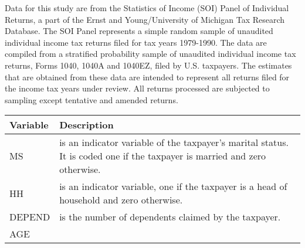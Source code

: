 \documentclass[]{book}
\begin{document}
Data for this study are from the Statistics of Income (SOI) Panel of Individual Returns, a part of the Ernst and Young/University of Michigan Tax Research Database. The SOI Panel represents a simple random sample of unaudited individual income tax returns filed for tax years 1979-1990. The data are compiled from a stratified probability sample of unaudited individual income tax returns, Forms 1040, 1040A and 1040EZ, filed by U.S. taxpayers. The estimates that are obtained from these data are intended to represent all returns filed for the income tax years under review. All returns processed are subjected to sampling except tentative and amended returns.

\begin{longtable}[]{@{}ll@{}}
\toprule
\begin{minipage}[b]{0.54\columnwidth}\raggedright
Variable\strut
\end{minipage} & \begin{minipage}[b]{0.40\columnwidth}\raggedright
Description\strut
\end{minipage}\tabularnewline
\midrule
\endhead
\begin{minipage}[t]{0.54\columnwidth}\raggedright
MS\strut
\end{minipage} & \begin{minipage}[t]{0.40\columnwidth}\raggedright
is an indicator variable of the taxpayer's marital status. It is coded one if the taxpayer is married and zero otherwise.\strut
\end{minipage}\tabularnewline
\begin{minipage}[t]{0.54\columnwidth}\raggedright
HH\strut
\end{minipage} & \begin{minipage}[t]{0.40\columnwidth}\raggedright
is an indicator variable, one if the taxpayer is a head of household and zero otherwise.\strut
\end{minipage}\tabularnewline
\begin{minipage}[t]{0.54\columnwidth}\raggedright
DEPEND\strut
\end{minipage} & \begin{minipage}[t]{0.40\columnwidth}\raggedright
is the number of dependents claimed by the taxpayer.\strut
\end{minipage}\tabularnewline
\begin{minipage}[t]{0.54\columnwidth}\raggedright
AGE\strut
\end{minipage} & \begin{minipage}[t]{0.40\columnwidth}\raggedright

\end{minipage}
\end{longtable}
\end{document}
